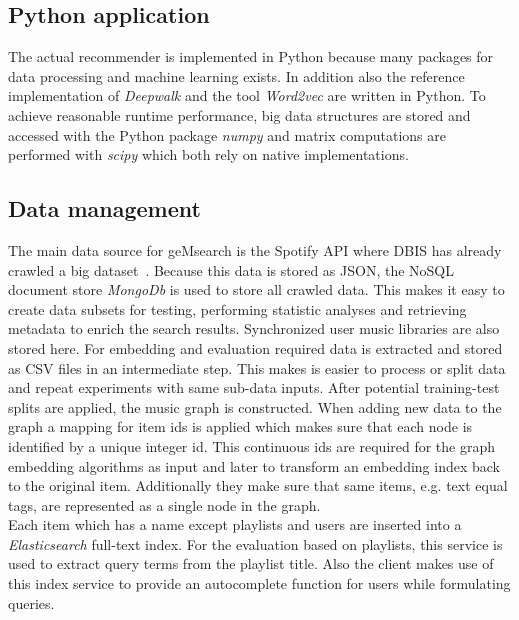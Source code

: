 \documentclass[sigconf]{acmart}
\begin{document}
\subsection{Python application}
The actual recommender is implemented in Python because many packages for data processing and machine learning exists. In addition also the reference implementation of \emph{Deepwalk} and the tool \emph{Word2vec} are written in Python. To achieve reasonable runtime performance, big data structures are stored and accessed with the Python package \emph{numpy} and matrix computations are performed with \emph{scipy} which both rely on native implementations.


\subsection{Data management}
The main data source for geMsearch is the Spotify API where DBIS has already crawled a big dataset~\cite{pichl2017improving}. Because this data is stored as JSON, the NoSQL document store \emph{MongoDb} is used to store all crawled data. This makes it easy to create data subsets for testing, performing statistic analyses and retrieving metadata to enrich the search results. Synchronized user music libraries are also stored here.
For embedding and evaluation required data is extracted and stored as CSV files in an intermediate step. This makes is easier to process or split data and repeat experiments with same sub-data inputs. After potential training-test splits are applied, the music graph is constructed. When adding new data to the graph a mapping for item ids is applied which makes sure that each node is identified by a unique integer id. This continuous ids are required for the graph embedding algorithms as input and later to transform an embedding index back to the original item. Additionally they make sure that same items, e.g. text equal tags, are represented as a single node in the graph. \\

Each item which has a name except playlists and users are inserted into a \emph{Elasticsearch} full-text index. For the evaluation based on playlists, this service is used to extract query terms from the playlist title. Also the client makes use of this index service to provide an autocomplete function for users while formulating queries.
\end{document}
